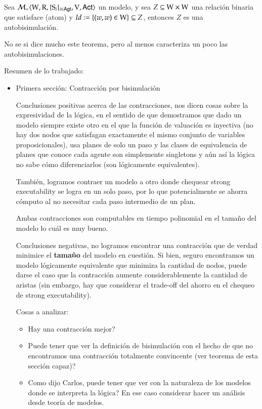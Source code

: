 \begin{teorema}
    Sea $\mathcal{M}_=\langle \mathrm{W},\mathrm{R},\{ \mathrm{S}_i \}_{i \in {\rm \sf Agt}},\mathrm{V},{\rm \sf Act} \rangle$ un modelo, y sea $Z \subseteq \mathrm{W} \times \mathrm{W}$ una relación binaria que satisface (atom) y $Id := \{(w,w)\in \mathrm{W}\} \subseteq Z$, entonces $Z$ es una autobisimulación.
\end{teorema}

No se si dice mucho este teorema, pero al menos caracteriza un poco las autobisimulaciones.

Resumen de lo trabajado:

\begin{itemize}

\item Primera sección: Contracción por bisimulación

Conclusiones positivas acerca de las contracciones, nos dicen cosas sobre la expresividad de la lógica, en el sentido de que demostramos que dado un modelo siempre existe otro en el que la función de valuación es inyectiva (no hay dos nodos que satisfagan exactamente el mismo conjunto de variables proposicionales), usa planes de solo un paso y las clases de equivalencia de planes que conoce cada agente son simplemente singletons y aún así la lógica no sabe cómo diferenciarlos (son lógicamente equivalentes).

También, logramos contraer un modelo a otro donde chequear strong executability se logra en un solo paso, por lo que potencialmente se ahorra cómputo al no necesitar cada paso intermedio de un plan.

Ambas contracciones son computables en tiempo polinomial en el tamaño del modelo lo cuál es muy bueno.


Conclusiones negativas, no logramos encontrar una contracción que de verdad minimice el \rm\textbf{tamaño} del modelo en cuestión. Si bien, seguro encontramos un modelo lógicamente equivalente que minimiza la cantidad de nodos, puede darse el caso que la contracción aumente considerablemente la cantidad de aristas (sin embargo, hay que considerar el trade-off del ahorro en el chequeo de strong executability).

Cosas a analizar: 
\begin{itemize}
    \item Hay una contracción mejor?
    \item Puede tener que ver la definición de bisimulación con el hecho de que no encontramos una contracción totalmente convincente (ver teorema de esta sección capaz)? 
    \item Como dijo Carlos, puede tener que ver con la naturaleza de los modelos donde se interpreta la lógica? En ese caso considerar hacer un análisis desde teoría de modelos.
\end{itemize}



\end{itemize}
